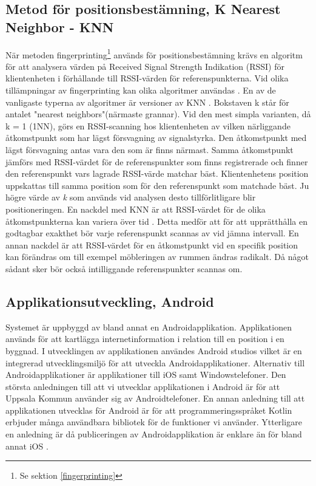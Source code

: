 \documentclass[swedish, a4paper,12pt]{article}
\begin{document}
\subsection{Metod för positionsbestämning, K Nearest Neighbor - KNN}\label{KNN}
När metoden fingerprinting\footnote{Se sektion \ref{fingerprinting}} används för positionsbestämning krävs en algoritm för att analysera värden på Received Signal Strength Indikation (RSSI) för klientenheten i förhållande till RSSI-värden för referenspunkterna. Vid olika tillämpningar av fingerprinting kan olika algoritmer användas \cite{tian2013fingerprint}\cite{jun2018low}. En av de vanligaste typerna av algoritmer är versioner av KNN \cite{tian2013fingerprint}.
Bokstaven k står för antalet "nearest neighbors"(närmaste grannar). Vid den mest simpla varianten, då k = 1 (1NN), görs en RSSI-scanning hos klientenheten av vilken närliggande åtkomstpunkt som har lägst försvagning av signalstyrka. Den åtkomstpunkt med lägst försvagning antas vara den som är finns närmast. Samma åtkomstpunkt jämförs med RSSI-värdet för de referenspunkter som finns registrerade och finner den referenspunkt vars lagrade RSSI-värde matchar bäst. Klientenhetens position uppskattas till samma position som för den referenspunkt som matchade bäst.
Ju högre värde av \textit{k} som används vid analysen desto tillförlitligare blir positioneringen\cite{yiu2017wireless}.
En nackdel med KNN är att RSSI-värdet för de olika åtkomstpunkterna kan variera över tid \cite{tian2013fingerprint}. Detta medför att för att upprätthålla en godtagbar exakthet bör varje referenspunkt scannas av vid jämna intervall.
En annan nackdel är att RSSI-värdet för en åtkomstpunkt vid en specifik position kan förändras om till exempel möbleringen av rummen ändras radikalt\cite{zanca2008experimental}. Då något sådant sker bör också intilliggande referenspunkter scannas om.

\subsection{Applikationsutveckling, Android}
Systemet är uppbyggd av bland annat en Androidapplikation. Applikationen används för att kartlägga internetinformation i relation till en position i en byggnad. I utvecklingen av applikationen användes Android studios vilket är en integrerad utvecklingsmiljö för att utveckla Androidapplikationer. Alternativ till Androidapplikationer är applikationer till iOS samt Windowstelefoner. Den största anledningen till att vi utvecklar applikationen i Android är för att Uppsala Kommun använder sig av Androidtelefoner. En annan anledning till att applikationen utvecklas för Android är för att programmeringsspråket Kotlin erbjuder många användbara bibliotek för de funktioner vi använder. Ytterligare en anledning är då publiceringen av Androidapplikation är enklare än för bland annat iOS \cite{submitIphone}\cite{android}.
\end{document}
